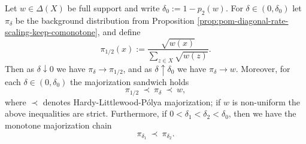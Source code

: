 \begin{theorem}\label{thm:pom-diagonal-rate-pi-majorization-chain}
Let \(w\in\Delta(X)\) be full support and write \(\delta_0:=1-p_2(w)\).
For \(\delta\in(0,\delta_0)\) let \(\pi_\delta\) be the background distribution from Proposition \ref{prop:pom-diagonal-rate-scaling-keep-comonotone}, and define
\[
\pi_{1/2}(x):=\frac{\sqrt{w(x)}}{\sum_{z\in X}\sqrt{w(z)}}.
\]
Then as \(\delta\downarrow 0\) we have \(\pi_\delta\to \pi_{1/2}\), and as \(\delta\uparrow\delta_0\) we have \(\pi_\delta\to w\).
Moreover, for each \(\delta\in(0,\delta_0)\) the majorization sandwich holds
\[
\pi_{1/2}\ \prec\ \pi_\delta\ \prec\ w,
\]
where \(\prec\) denotes Hardy-Littlewood-P\'olya majorization; if \(w\) is non-uniform the above inequalities are strict.
Furthermore, if \(0<\delta_1<\delta_2<\delta_0\), then we have the monotone majorization chain
\[
\pi_{\delta_1}\ \prec\ \pi_{\delta_2}.
\]
\end{theorem}
